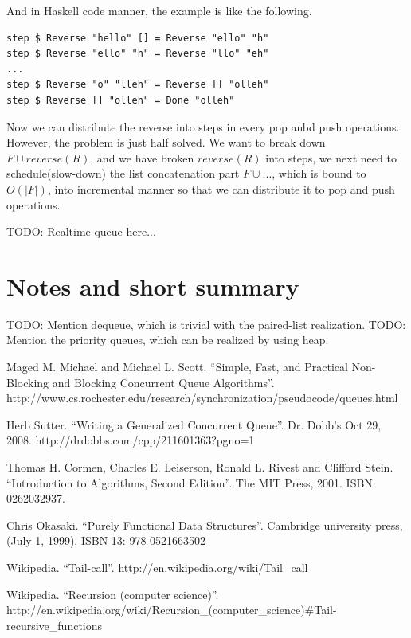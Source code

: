 \documentclass{article}
\begin{document}
And in Haskell code manner, the example is like the following.

\lstset{language=Haskell}
\begin{lstlisting}
step $ Reverse "hello" [] = Reverse "ello" "h"
step $ Reverse "ello" "h" = Reverse "llo" "eh"
...
step $ Reverse "o" "lleh" = Reverse [] "olleh"
step $ Reverse [] "olleh" = Done "olleh"
\end{lstlisting}

Now we can distribute the reverse into steps in every pop anbd push 
operations. However, the problem is just half solved. We want to
break down $ F \cup reverse(R)$, and we have broken $reverse(R)$
into steps, we next need to schedule(slow-down) the list concatenation
part $F \cup ...$, which is bound to $O(|F|)$, into incremental
manner so that we can distribute it to pop and push operations.

TODO: Realtime queue here...

\section{Notes and short summary}

TODO: Mention dequeue, which is trivial with the paired-list realization.
TODO: Mention the priority queues, which can be realized by using heap.


\begin{thebibliography}{99}

Maged M. Michael and Michael L. Scott. ``Simple, Fast, and Practical Non-Blocking and Blocking Concurrent Queue Algorithms''. http://www.cs.rochester.edu/research/synchronization/pseudocode/queues.html

Herb Sutter. ``Writing a Generalized Concurrent Queue''. Dr. Dobb's Oct 29, 2008. http://drdobbs.com/cpp/211601363?pgno=1

Thomas H. Cormen, Charles E. Leiserson, Ronald L. Rivest and Clifford Stein. ``Introduction to Algorithms, Second Edition''. The MIT Press, 2001. ISBN: 0262032937.

Chris Okasaki. ``Purely Functional Data Structures''. Cambridge university press, (July 1, 1999), ISBN-13: 978-0521663502

Wikipedia. ``Tail-call''. http://en.wikipedia.org/wiki/Tail\_call

Wikipedia. ``Recursion (computer science)''. http://en.wikipedia.org/wiki/Recursion\_(computer\_science)\#Tail-recursive\_functions

\end{thebibliography}

\ifx\wholebook\relax \else
\end{document}

